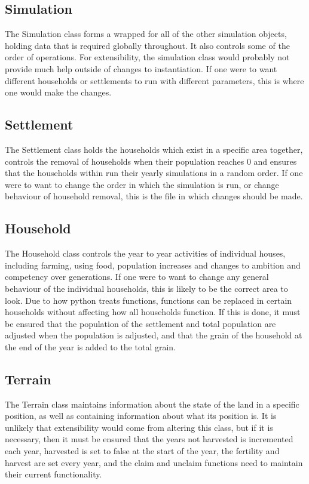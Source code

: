 \documentclass[12pt]{article}
\begin{document}
			\subsection{Simulation}
				The Simulation class forms a wrapped for all of the other simulation objects, holding data that is required globally throughout. It also controls some of the order of operations. For extensibility, the simulation class would probably not provide much help outside of changes to instantiation. If one were to want different households or settlements to run with different parameters, this is where one would make the changes.
			\subsection{Settlement}
				The Settlement class holds the households which exist in a specific area together, controls the removal of households when their population reaches 0 and ensures that the households within run their yearly simulations in a random order. If one were to want to change the order in which the simulation is run, or change behaviour of household removal, this is the file in which changes should be made.
			\subsection{Household}
				The Household class controls the year to year activities of individual houses, including farming, using food, population increases and changes to ambition and competency over generations. If one were to want to change any general behaviour of the individual households, this is likely to be the correct area to look. Due to how python treats functions, functions can be replaced in certain households without affecting how all households function. If this is done, it must be ensured that the population of the settlement and total population are adjusted when the population is adjusted, and that the grain of the household at the end of the year is added to the total grain.
			\subsection{Terrain}
				The Terrain class maintains information about the state of the land in a specific position, as well as containing information about what its position is. It is unlikely that extensibility would come from altering this class, but if it is necessary, then it must be ensured that the years not harvested is incremented each year, harvested is set to false at the start of the year, the fertility and harvest are set every year, and the claim and unclaim functions need to maintain their current functionality. 
\end{document}

